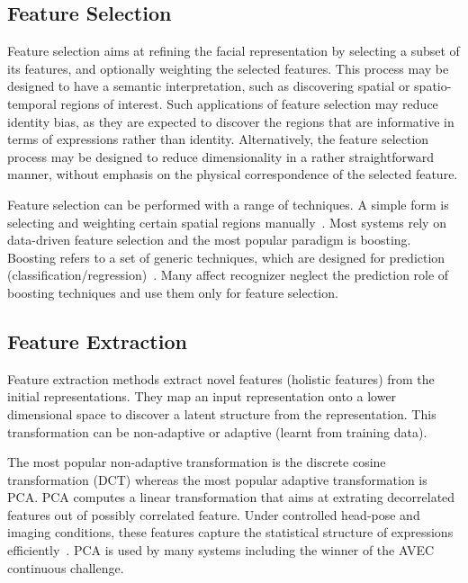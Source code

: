 \documentclass[10pt,twocolumn,letterpaper]{article}
\begin{document}
	\subsection*{Feature Selection}
	Feature selection aims at refining the facial representation by selecting a subset of its features, and optionally weighting the selected features. This process may be designed to have a semantic interpretation, such as discovering spatial or spatio-temporal regions of interest. Such applications of feature selection may reduce identity bias, as they are expected to discover the regions that are informative in terms of expressions rather than identity. Alternatively, the feature selection process may be designed to reduce dimensionality in a rather straightforward manner, without emphasis on the physical correspondence of the selected feature.
	\par
	Feature selection can be performed with a range of techniques. A simple form is selecting and weighting certain spatial regions manually~\cite{Shan}. Most systems rely on data-driven feature selection and the most popular paradigm is boosting. Boosting refers to a set of generic techniques, which are designed for prediction (classification/regression)~\cite{friedman2000}. Many affect recognizer neglect the prediction role of boosting techniques and use them only for feature selection.
	\subsection*{Feature Extraction}
	Feature extraction methods extract novel features (\eg holistic features) from the initial representations. They map an input representation onto a lower dimensional space to discover a latent structure from the representation. This transformation can be non-adaptive or adaptive (learnt from training data).
	\par
	The most popular non-adaptive transformation is the discrete cosine transformation (DCT) whereas the most popular adaptive transformation is PCA. PCA computes a linear transformation that aims at extrating decorrelated features out of possibly correlated feature. Under controlled head-pose and imaging conditions, these features capture the statistical structure of expressions efficiently~\cite{CALDER20011179}. PCA is used by many systems including the winner of the AVEC continuous challenge.
	{\small
		
		
	}
\end{document}
